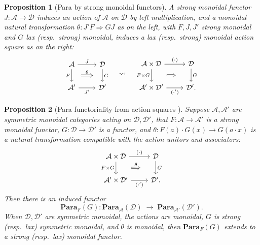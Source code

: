 \documentclass[11pt, oneside, article]{memoir}
\theoremstyle{definition}
\theoremstyle{plain}
\newtheorem{proposition}[proposition]{Proposition}
\newcommand{\cat}[1]{\mathcal{#1}}%
\newcommand{\Cat}[1]{\mathbf{#1}}%
\newcommand{\Para}{\Cat{Para}}
\newcommand{\para}[2]{\Para_{#1}(#2)}
\begin{document}
\begin{proposition}[Para by strong monoidal functors]\label{prop.para_strong_induced}
A strong monoidal functor $J\colon\cat{A}\to\cat{D}$ induces an action of $\cat{A}$ on $\cat{D}$ by left multiplication, and a monoidal natural transformation $\theta\colon J'F\Rightarrow GJ$ as on the left, with $F,J,J'$ strong monoidal and $G$ lax (resp.\ strong) monoidal, induces a lax (resp.\ strong) monoidal action square as on the right:
\[
\begin{tikzcd}[ampersand replacement=\&]
\cat A\ar[r,"J"]\ar[d,"F"', ""{name=left}]\& \cat D\ar[d,"G", ""' {name=right}]\\
\cat A'\ar[r,"J'"']\& \cat D'
\arrow[Rightarrow, from=left, to=right, shorten <=3mm, shorten >=3mm, "\theta"]
\end{tikzcd}
\quad\leadsto\quad
\begin{tikzcd}[ampersand replacement=\&]
\cat A\times\cat D\ar[r,"(\cdot)"]\ar[d,"F\times G"', ""{name=left}]\& \cat D\ar[d,"G", ""' {name=right}]\\
\cat A'\times\cat D'\ar[r,"(\cdot')"']\& \cat D'.
\arrow[Rightarrow, from=left, to=right, shorten <=6mm, shorten >=6mm]
\end{tikzcd}
\]
\end{proposition}

\begin{proposition}[Para functoriality from action squares {\cite[\S 3.6, eq.~(3.59)]{capucci2024actegories}}]\label{prop.para_square}
Suppose $\cat A,\cat A'$ are symmetric monoidal categories acting on $\cat D,\cat D'$, that $F\colon\cat A\to\cat A'$ is a strong monoidal functor, $G\colon\cat D\to\cat D'$ is a functor, and $\theta\colon F(a)\cdot G(x)\to G(a\cdot x)$ is a natural transformation compatible with the action unitors and associators:
\begin{equation}\label{eqn.para_square}
\begin{tikzcd}[ampersand replacement=\&]
\cat A\times\cat D\ar[r,"(\cdot)"]\ar[d,"F\times G"', ""{name=left}]\& \cat D\ar[d,"G", ""' {name=right}]\\
\cat A'\times\cat D'\ar[r,"(\cdot')"']\& \cat D'.
\arrow[Rightarrow, from=left, to=right, shorten <=6mm, shorten >=6mm, "\theta"]
\end{tikzcd}
\end{equation}
Then there is an induced functor
\[
\para{F}{G}\colon\para{\cat A}{\cat D}\;\longrightarrow\;\para{\cat A'}{\cat D'}.
\]
When $\cat D,\cat D'$ are symmetric monoidal, the actions are monoidal, $G$ is strong (resp.\ lax) symmetric monoidal, and $\theta$ is monoidal, then $\para{F}{G}$ extends to a strong (resp.\ lax) monoidal functor.
\end{proposition}
\end{document}
